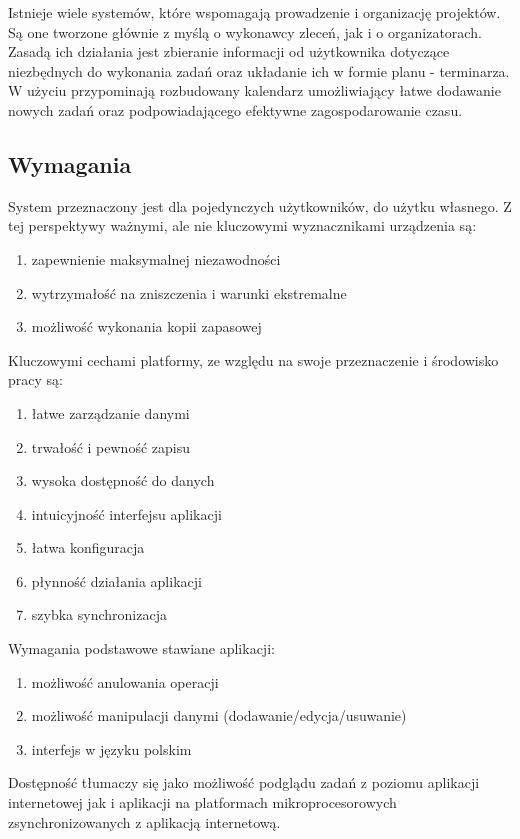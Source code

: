 Istnieje wiele systemów, które wspomagają prowadzenie i organizację projektów. Są one tworzone głównie z myślą o wykonawcy zleceń, jak i o organizatorach. Zasadą ich działania jest zbieranie informacji od użytkownika dotyczące niezbędnych do wykonania zadań oraz układanie ich w formie planu - terminarza. W użyciu przypominają rozbudowany kalendarz umożliwiający łatwe dodawanie nowych zadań oraz podpowiadającego efektywne zagospodarowanie czasu.

\subsection{Wymagania} %
\label{sub:wymagania}
System przeznaczony jest dla pojedynczych użytkowników, do użytku własnego. Z tej perspektywy ważnymi, ale nie kluczowymi wyznacznikami urządzenia są:
\begin{enumerate}
	\item zapewnienie maksymalnej niezawodności
	\item wytrzymałość na zniszczenia i warunki ekstremalne
	\item możliwość wykonania kopii zapasowej
\end{enumerate}

Kluczowymi cechami platformy, ze względu na swoje przeznaczenie i środowisko pracy są:
\begin{enumerate}
	\item łatwe zarządzanie danymi
	\item trwałość i pewność zapisu
	\item wysoka dostępność do danych
	\item intuicyjność interfejsu aplikacji
	\item łatwa konfiguracja
	\item płynność działania aplikacji
	\item szybka synchronizacja
\end{enumerate}

Wymagania podstawowe stawiane aplikacji:
\begin{enumerate}
	\item możliwość anulowania operacji
	\item możliwość manipulacji danymi (dodawanie/edycja/usuwanie)
	\item interfejs w języku polskim
\end{enumerate}

Dostępność tłumaczy się jako możliwość podglądu zadań z poziomu aplikacji internetowej jak i aplikacji na platformach mikroprocesorowych zsynchronizowanych z aplikacją internetową.


